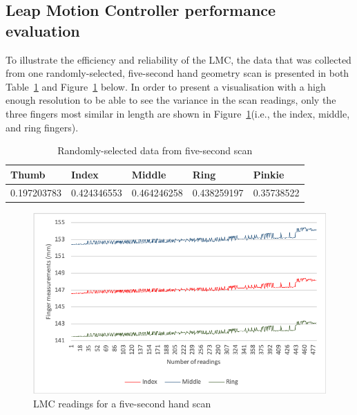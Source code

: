 \subsection{Leap Motion Controller performance evaluation}

To illustrate the efficiency and reliability of the LMC, the data that was collected from one randomly-selected, five-second hand geometry scan is presented in both Table~\ref{table: Randomly selected data from five second scan} and Figure~\ref{fig:Five Second hand scan graph} below. 
In order to present a visualisation with a high enough resolution to be able to see the variance in the scan readings, only the three fingers most similar in length are shown in Figure~\ref{fig:Five Second hand scan graph}(i.e., the index, middle, and ring fingers). 

    
    \begin{table}[h!]
    \caption{Randomly-selected data from five-second scan}
    \centering
     \begin{tabular}{|p{} | p{}| p{}| p{}| p{}|} 
     \hline
    	\textbf{Thumb} & \textbf{Index} & \textbf{Middle} & \textbf{Ring} & \textbf{Pinkie} \\ [1ex] 
     \hline\hline 
     0.197203783 & 0.424346553 &  0.464246258 & 0.438259197 & 0.35738522 \\[1ex]
     \hline 
     \end{tabular}
     \label{table: Randomly selected data from five second scan}
    \end{table}

    
    \begin{figure}[htbp!] 
    \centering    
    \includegraphics[width=1.0\textwidth]{Chapter4/Figs/Consistency.png}
    \caption[Five second hand scan]{LMC readings for a five-second hand scan }
    \label{fig:Five Second hand scan graph}
    \end{figure}
    
